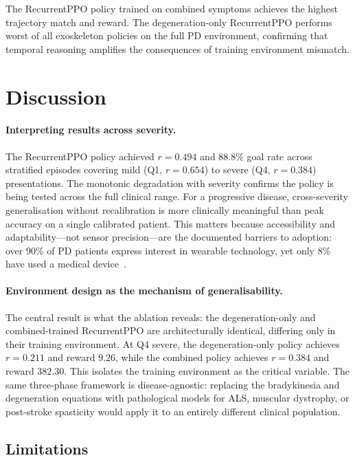 \documentclass{article}
\begin{document}
The RecurrentPPO policy trained on combined symptoms achieves the highest
trajectory match and reward. The degeneration-only RecurrentPPO performs
worst of all exoskeleton policies on the full PD environment, confirming
that temporal reasoning amplifies the consequences of training environment
mismatch.

\section{Discussion}
\label{sec:discussion}

\paragraph{Interpreting results across severity.}
The RecurrentPPO policy achieved $r{=}0.494$ and $88.8\%$ goal rate
across stratified episodes covering mild (Q1, $r{=}0.654$) to severe
(Q4, $r{=}0.384$) presentations. The monotonic degradation with severity
confirms the policy is being tested across the full clinical range. For a
progressive disease, cross-severity generalisation without recalibration
is more clinically meaningful than peak accuracy on a single calibrated
patient. This matters because accessibility and adaptability---not sensor
precision---are the documented barriers to adoption: over $90\%$ of PD
patients express interest in wearable technology, yet only $8\%$ have
used a medical device~\citep{hirczy2024, reicherzer2024}.

\paragraph{Environment design as the mechanism of generalisability.}
The central result is what the ablation reveals: the degeneration-only
and combined-trained RecurrentPPO are architecturally identical, differing
only in their training environment. At Q4 severe, the degeneration-only
policy achieves $r{=}0.211$ and reward $9.26$, while the combined policy
achieves $r{=}0.384$ and reward $382.30$. This
isolates the training environment as the critical variable. The same
three-phase framework is disease-agnostic: replacing the bradykinesia and
degeneration equations with pathological models for ALS, muscular
dystrophy, or post-stroke spasticity would apply it to an entirely
different clinical population.

\subsection{Limitations}
\end{document}
